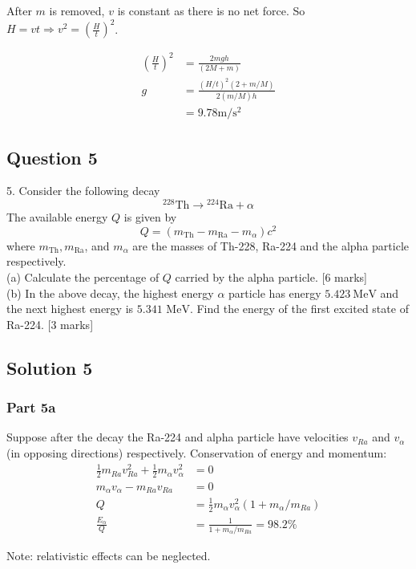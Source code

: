\documentclass{article}
\begin{document}
After $m$ is removed, $v$ is constant as there is no net force. So $H=vt\Rightarrow v^2=\left(\frac{H}{t}\right)^2$.

\begin{align}
    \left(\frac{H}{t}\right)^2 &= \frac{2mgh}{(2M+m)} \\
    g &= \frac{(H/t)^2(2+m/M)}{2(m/M)h} \\
     &= 9.78 \mathrm{m/s^2}
\end{align}

\subsection{Question 5}
5. Consider the following decay
$$
{ }^{228} \mathrm{Th} \rightarrow{ }^{224} \mathrm{Ra}+\alpha
$$
The available energy $Q$ is given by
$$
Q=\left(m_{\mathrm{Th}}-m_{\mathrm{Ra}}-m_{\alpha}\right) c^{2}
$$
where $m_{\mathrm{Th}}, m_{\mathrm{Ra}}$, and $m_{\alpha}$ are the masses of Th-228, Ra-224 and the alpha particle respectively. \\
(a) Calculate the percentage of $Q$ carried by the alpha particle. [6 marks] \\
(b) In the above decay, the highest energy $\alpha$ particle has energy $5.423 \mathrm{~MeV}$ and the next highest energy is $5.341$ $\mathrm{MeV}$. Find the energy of the first excited state of Ra-224. [3 marks]

\subsection{Solution 5}

\subsubsection{Part 5a}
Suppose after the decay the Ra-224 and alpha particle have velocities $v_{Ra}$ and $v_\alpha$ (in opposing directions) respectively. Conservation of energy and momentum:
\begin{align}
    \frac{1}{2}m_{Ra}v_{Ra}^2 + \frac{1}{2}m_\alpha v_\alpha^2 &= 0\\
    m_\alpha v_\alpha - m_{Ra} v_{Ra} &= 0 \\
    Q &= \frac{1}{2}m_\alpha v_\alpha^2(1+m_\alpha / m_{Ra} ) \\
    \frac{E_\alpha}{Q} &= \frac{1}{1+m_\alpha / m_{Ra} } = 98.2 \%
\end{align}

Note: relativistic effects can be neglected.
\end{document}
